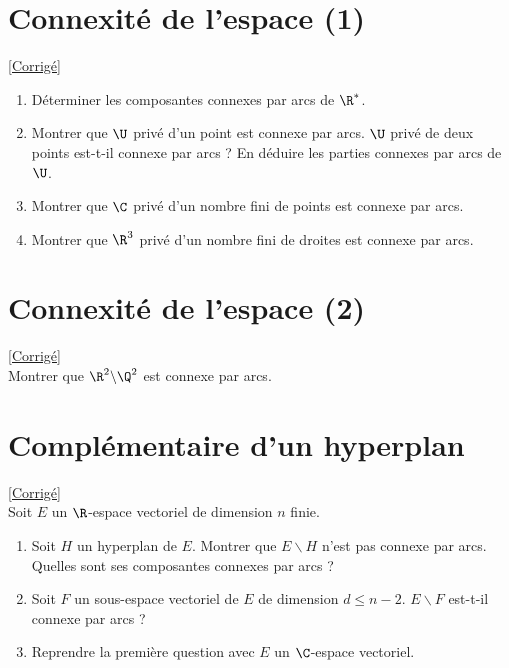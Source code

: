 \documentclass{book}
\begin{document}
\section{Connexité de l'espace (1) }
\label{Connexité de l'espace (1)}
\textcolor{blue}{\hyperref[sec:connexité-de-l'espace-(1)]{[Corrigé]}}\\
\begin{enumerate}[leftmargin=*]
	\item Déterminer les composantes connexes par arcs de $\R^*$.
	\item Montrer que $\U$ privé d'un point est connexe par arcs. $\U$ privé de deux points est-t-il connexe par arcs ? En déduire les parties connexes par arcs de $\U$.
	\item Montrer que $\C$ privé d'un nombre fini de points est connexe par arcs.
	\item Montrer que $\R^3$ privé d'un nombre fini de droites est connexe par arcs.
\end{enumerate}

\section{Connexité de l'espace (2)}
\label{Connexité de l'espace (2)}
\textcolor{blue}{\hyperref[sec:connexité-de-l'espace-(2)]{[Corrigé]}}\\
Montrer que $\R^2\backslash\Q^2$ est connexe par arcs.

\section{Complémentaire d'un hyperplan }
\label{Complémentaire d'un hyperplan}
\textcolor{blue}{\hyperref[sec:complementaire-dun-hyperplan]{[Corrigé]}}\\
Soit $E$ un $\R$-espace vectoriel de dimension $n$ finie.
\begin{enumerate}
	\item Soit $H$ un hyperplan de $E$. Montrer que $E\backslash H$ n'est pas connexe par arcs. Quelles sont ses composantes connexes par arcs ?
	\item Soit $F$ un sous-espace vectoriel de $E$ de dimension $d\leq n-2$. $E\backslash F$ est-t-il connexe par arcs ?
	\item Reprendre la première question avec $E$ un $\C$-espace vectoriel.
\end{enumerate}
\end{document}
